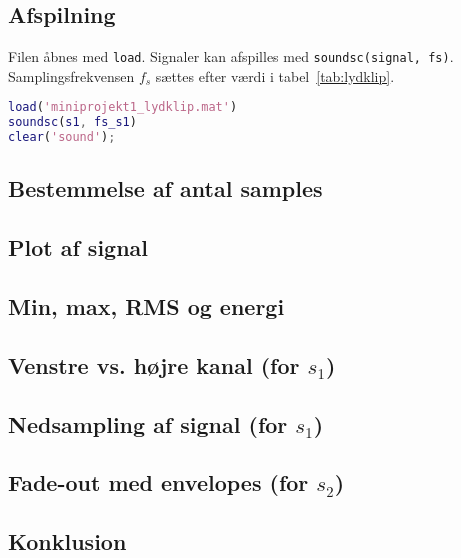 \documentclass[a4paper]{report}
\begin{document}
\section{Afspilning}

        \begin{par}

Filen åbnes med \texttt{load}.
Signaler kan afspilles med \texttt{soundsc(signal, fs)}.
Samplingsfrekvensen $f_s$ sættes efter værdi i tabel~\ref{tab:lydklip}.

\end{par} 

\begin{lstlisting}[language=Matlab, style=Matlab-editor]
load('miniprojekt1_lydklip.mat')
soundsc(s1, fs_s1)
clear('sound');
\end{lstlisting}



\section{Bestemmelse af antal samples}

        


\section{Plot af signal}

        


\section{Min, max, RMS og energi}

        


\section{Venstre vs. højre kanal (for $s_1$)}

        


\section{Nedsampling af signal (for $s_1$)}

        


\section{Fade-out med envelopes (for $s_2$)}

        \begin{par}
\chapter{Konklusion}
\end{par} 
\end{document}
